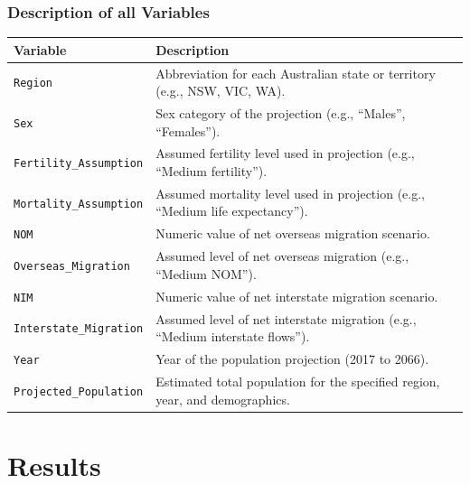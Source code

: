 \documentclass[
  11pt,
]{article}
\begin{document}
\subsubsection{Description of all
Variables}\label{description-of-all-variables}

\begin{longtable}[]{@{}
  >{\raggedright\arraybackslash}p{}
  >{\raggedright\arraybackslash}p{}@{}}
\toprule\noalign{}
\begin{minipage}[b]{\linewidth}\raggedright
\textbf{Variable}
\end{minipage} & \begin{minipage}[b]{\linewidth}\raggedright
\textbf{Description}
\end{minipage} \\
\midrule\noalign{}
\endhead
\bottomrule\noalign{}
\endlastfoot
\texttt{Region} & Abbreviation for each Australian state or territory
(e.g., NSW, VIC, WA). \\
\texttt{Sex} & Sex category of the projection (e.g., ``Males'',
``Females''). \\
\texttt{Fertility\_Assumption} & Assumed fertility level used in
projection (e.g., ``Medium fertility''). \\
\texttt{Mortality\_Assumption} & Assumed mortality level used in
projection (e.g., ``Medium life expectancy''). \\
\texttt{NOM} & Numeric value of net overseas migration scenario. \\
\texttt{Overseas\_Migration} & Assumed level of net overseas migration
(e.g., ``Medium NOM''). \\
\texttt{NIM} & Numeric value of net interstate migration scenario. \\
\texttt{Interstate\_Migration} & Assumed level of net interstate
migration (e.g., ``Medium interstate flows''). \\
\texttt{Year} & Year of the population projection (2017 to 2066). \\
\texttt{Projected\_Population} & Estimated total population for the
specified region, year, and demographics. \\
\end{longtable}

\section{Results}\label{sec-results}
\end{document}
